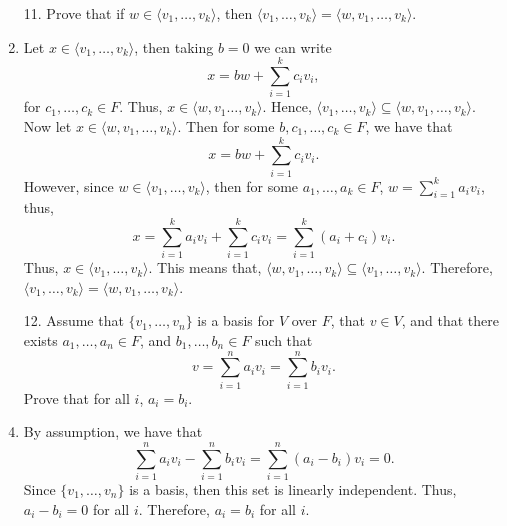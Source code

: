 \documentclass[12pt]{article}
\makeatletter
\theoremstyle{definition}
\theoremstyle{remark}
\renewenvironment{proof}[1][\proofname]{\par
  \pushQED{\qed}%
  \normalfont \topsep6\p@\@plus6\p@\relax
  \list{}{\leftmargin=0mm
          \rightmargin=4mm
          \settowidth{\itemindent}{\itshape#1}%
          \labelwidth=\itemindent
          \parsep=0pt \listparindent=\parindent 
  }
  \item[\hskip\labelsep
        \itshape
    #1\@addpunct{.}]\ignorespaces
}{%
  \popQED\endlist\@endpefalse
}
\let\oldproofname=\proofname
\renewcommand{\proofname}{\bf{\textit{\oldproofname}}}
\makeatother
\begin{document}
\begin{enumerate}[leftmargin=*]
        \item[11.] Prove that if $w\in\langle v_1,\dots,v_k\rangle$, then $\langle v_1,\dots,v_k\rangle=\langle w,v_1,\dots, v_k\rangle$.
            \begin{proof}
                Let $x\in\langle v_1,\dots,v_k\rangle$, then taking $b=0$ we can write
                    \begin{equation*}
                        x=bw+\sum\limits_{i=1}^kc_iv_i,
                    \end{equation*}
                for $c_1,\dots,c_k\in F$. Thus, $x\in\langle w,v_1\dots,v_k\rangle$. Hence, $\langle v_1,\dots,v_k\rangle\subseteq\langle w,v_1,\dots,v_k\rangle$. Now let $x\in\langle w,v_1,\dots,v_k\rangle$. Then for some $b,c_1,\dots, c_k\in F$, we have that
                    \begin{equation*}
                        x=bw+\sum\limits_{i=1}^k c_iv_i.
                    \end{equation*}
                However, since $w\in\langle v_1,\dots,v_k\rangle$, then for some $a_1,\dots,a_k\in F$, $w=\sum\limits_{i=1}^k a_iv_i$, thus,
                    \begin{equation*}
                        x=\sum\limits_{i=1}^ka_iv_i+\sum\limits_{i=1}^kc_iv_i=\sum\limits_{i=1}^k(a_i+c_i)v_i.
                    \end{equation*}
                Thus, $x\in\langle v_1,\dots,v_k\rangle$. This means that, $\langle w,v_1,\dots,v_k\rangle\subseteq\langle v_1,\dots, v_k\rangle$. Therefore, $\langle v_1,\dots,v_k\rangle=\langle w,v_1,\dots,v_k\rangle$.
            \end{proof}
            
        \item[12.] Assume that $\{v_1,\dots,v_n\}$ is a basis for $V$ over $F$, that $v\in V$, and that there exists $a_1,\dots,a_n\in F$, and $b_1,\dots,b_n\in F$ such that 
            \begin{equation*}
                v=\sum\limits_{i=1}^n a_iv_i=\sum\limits_{i=1}^nb_iv_i.
            \end{equation*}
        Prove that for all $i$, $a_i=b_i$.
            \begin{proof}
                By assumption, we have that 
                    \begin{equation*}
                        \sum\limits_{i=1}^na_iv_i-\sum\limits_{i=1}^nb_iv_i=\sum\limits_{i=1}^n(a_i-b_i)v_i=0.
                    \end{equation*}
                Since $\{v_1,\dots,v_n\}$ is a basis, then this set is linearly independent. Thus, $a_i-b_i=0$ for all $i$. Therefore, $a_i=b_i$ for all $i$.
            \end{proof}
            

\end{enumerate}
\end{document}
